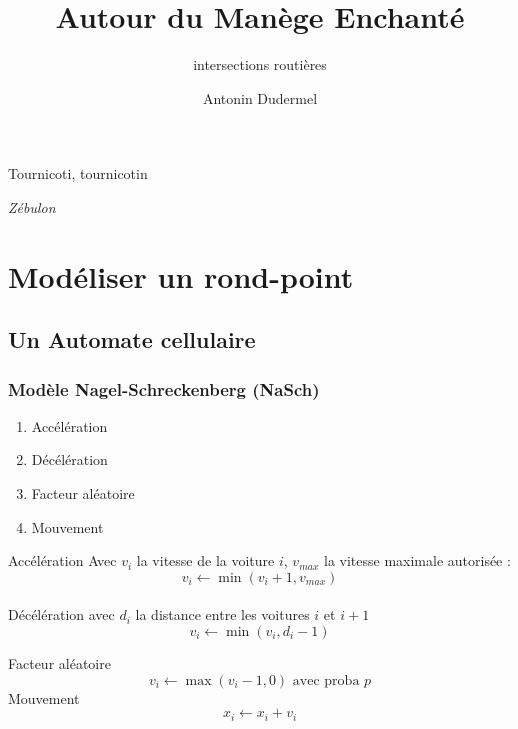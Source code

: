 \documentclass[slidetop,11pt]{beamer}
\title{Autour du Manège Enchanté}
\subtitle{intersections routières}
\date{}
\author{Antonin Dudermel}
\begin{document}

\frame{\titlepage}

\begin{frame}
	\epigraph{Tournicoti, tournicotin}{\it Zébulon}
\end{frame}

\begin{frame}
	\tableofcontents
\end{frame}

\section{Modéliser un rond-point}

	\subsection{Un Automate cellulaire}
		\begin{frame}
	\frametitle{Modèle Nagel-Schreckenberg (NaSch)}
	\begin{enumerate}
		\item Accélération 
		\item Décélération
		\item Facteur aléatoire
		\item Mouvement
	\end{enumerate}
\end{frame}

\begin{frame}
Accélération
	Avec $v_i$ la vitesse de la voiture $i$, $v_{max}$ la vitesse maximale autorisée : 
	\begin{equation}
		v_i \leftarrow \min (v_i+1,v_{max})
	\end{equation}
\\

Décélération
	avec $d_i$ la distance entre les voitures $i$ et $i+1$
	\begin{equation}
		v_i \leftarrow \min (v_i,d_i-1)
	\end{equation}


Facteur aléatoire
	\begin{equation}
		v_i \leftarrow \max(v_i-1,0) \text{ avec proba } p
	\end{equation}
	Mouvement
	\begin{equation}
		x_i \leftarrow x_i + v_i
	\end{equation}
\end{frame}
\end{document}
